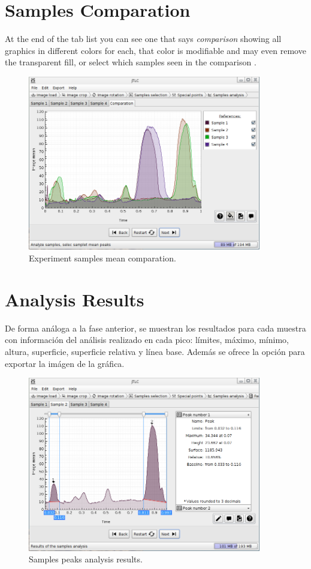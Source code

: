 \section{Samples Comparation}
At the end of the tab list you can see one that says \emph{comparison} showing all graphics in different colors for each, that color is modifiable and may even remove the transparent fill, or select which samples seen in the comparison .
\begin{figure}[H]
	\vspace{0cm}
	\centering
	\includegraphics[width=385px]{imagenes/comparation}
	\centering
	\vspace{-0.4cm}
	\caption{Experiment samples mean comparation.}
	\label{fig:image_samples_comparation}
	\vspace{-0.25cm}
\end{figure}

\section{Analysis Results}
De forma an\'aloga a la fase anterior, se muestran los resultados para cada muestra con informaci\'on del an\'alisis realizado en cada pico: l\'imites, m\'aximo, m\'inimo, altura, superficie, superficie relativa y l\'inea  base. Adem\'as se ofrece la opci\'on para exportar la im\'agen de la gr\'afica.
\begin{figure}[H]
	\vspace{0cm}
	\centering
	\includegraphics[width=385px]{imagenes/peaks}
	\centering
	\vspace{-0.4cm}
	\caption{Samples peaks analysis results.}
	\label{fig:image_analysis_results}
	\vspace{-0.25cm}
\end{figure}

